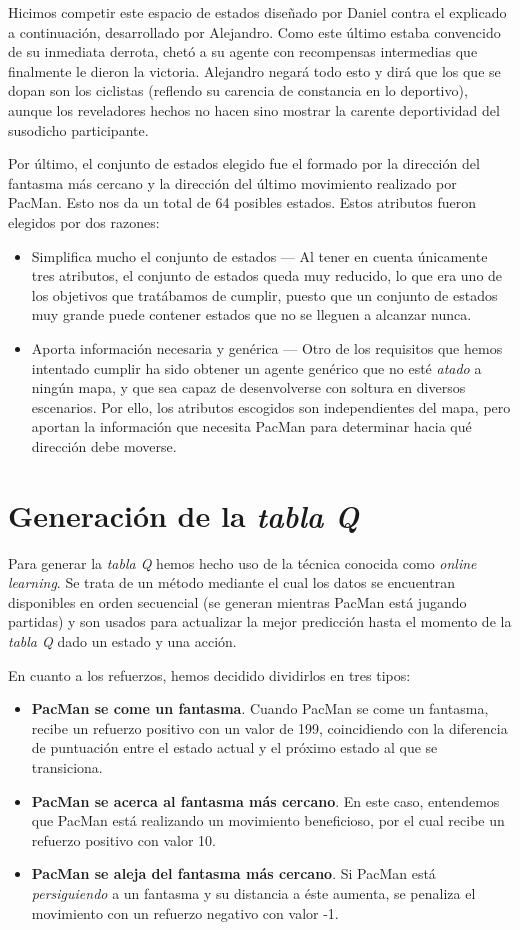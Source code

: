 \documentclass[12pt]{article}
\begin{document}
Hicimos competir este espacio de estados diseñado por Daniel contra el explicado a continuación, desarrollado por Alejandro. Como este último estaba convencido de su inmediata derrota, chetó a su agente con recompensas intermedias que finalmente le dieron la victoria. Alejandro negará todo esto y dirá que los que se dopan son los ciclistas (reflendo su carencia de constancia en lo deportivo), aunque los reveladores hechos no hacen sino mostrar la carente deportividad del susodicho participante.

Por último, el conjunto de estados elegido fue el formado por la dirección del fantasma más cercano y la dirección del último movimiento realizado por PacMan. Esto nos da un total de 64 posibles estados. Estos atributos fueron elegidos por dos razones:
\begin{itemize}
	\item Simplifica mucho el conjunto de estados — Al tener en cuenta únicamente tres atributos, el conjunto de estados queda muy reducido, lo que era uno de los objetivos que tratábamos de cumplir, puesto que un conjunto de estados muy grande puede contener estados que no se lleguen a alcanzar nunca.
	\item Aporta información necesaria y genérica — Otro de los requisitos que hemos intentado cumplir ha sido obtener un agente genérico que no esté \textit{atado} a ningún mapa, y que sea capaz de desenvolverse con soltura en diversos escenarios. Por ello, los atributos escogidos son independientes del mapa, pero aportan la información que necesita PacMan para determinar hacia qué dirección debe moverse.
\end{itemize}

\section{Generación de la \textit{tabla Q}}

Para generar la \textit{tabla Q} hemos hecho uso de la técnica conocida como \textit{online learning}. Se trata de un método mediante el cual los datos se encuentran disponibles en orden secuencial (se generan mientras PacMan está jugando partidas) y son usados para actualizar la mejor predicción hasta el momento de la \textit{tabla Q} dado un estado y una acción.

En cuanto a los refuerzos, hemos decidido dividirlos en tres tipos:
\begin{itemize}
	\item \textbf{PacMan se come un fantasma}. Cuando PacMan se come un fantasma, recibe un refuerzo positivo con un valor de 199, coincidiendo con la diferencia de puntuación entre el estado actual y el próximo estado al que se transiciona.
	\item \textbf{PacMan se acerca al fantasma más cercano}. En este caso, entendemos que PacMan está realizando un movimiento beneficioso, por el cual recibe un refuerzo positivo con valor 10.
	\item \textbf{PacMan se aleja del fantasma más cercano}. Si PacMan está \textit{persiguiendo} a un fantasma y su distancia a éste aumenta, se penaliza el movimiento con un refuerzo negativo con valor -1.
\end{itemize}
\end{document}
